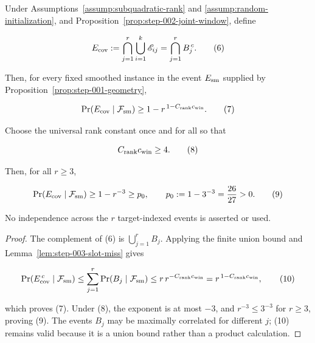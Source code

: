 \begin{proposition}\label{prop:step-003-coupon}
Under Assumptions~\ref{assump:subquadratic-rank} and
\ref{assump:random-initialization}, and
Proposition~\ref{prop:step-002-joint-window}, define

\[
E_{\rm cov}:=\bigcap_{j=1}^r\bigcup_{i=1}^k\mathscr E_{ij}
   =\bigcap_{j=1}^r B_j^{\,c}.
\tag{6}
\]

Then, for every fixed smoothed instance in the event
$E_{\rm sm}$ supplied by Proposition~\ref{prop:step-001-geometry},

\[
\Pr(E_{\rm cov}\mid\mathcal F_{\rm sm})
\ge 1-r^{\,1-C_{\rm rank}c_{\rm win}}.
\tag{7}
\]

Choose the universal rank constant once and for all so that

\[
C_{\rm rank}c_{\rm win}\ge4.
\tag{8}
\]

Then, for all \(r\ge3\),

\[
\Pr(E_{\rm cov}\mid\mathcal F_{\rm sm})\ge1-r^{-3}\ge
p_0,\qquad p_0:=1-3^{-3}={26\over27}>0.
\tag{9}
\]

No independence across the \(r\) target-indexed events is asserted or used.

\begin{proof}
The complement of (6) is \(\bigcup_{j=1}^rB_j\). Applying the finite
union bound and Lemma~\ref{lem:step-003-slot-miss} gives

\[
\Pr(E_{\rm cov}^{\,c}\mid\mathcal F_{\rm sm})
\le\sum_{j=1}^r\Pr(B_j\mid\mathcal F_{\rm sm})
\le r\,r^{-C_{\rm rank}c_{\rm win}}
=r^{\,1-C_{\rm rank}c_{\rm win}},
\tag{10}
\]

which proves (7). Under (8), the exponent is at most \(-3\), and
\(r^{-3}\le3^{-3}\) for \(r\ge3\), proving (9). The events \(B_j\) may be
maximally correlated for different \(j\); (10) remains valid because it is a
union bound rather than a product calculation. 


\end{proof}
\end{proposition}
